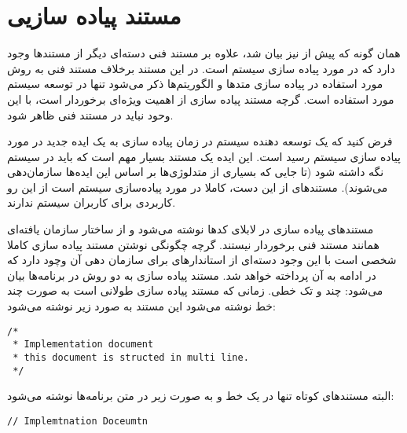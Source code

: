 %
% 
% 
% 
%
\section{مستند پیاده سازیی}
همان گونه که پیش از نیز بیان شد، علاوه بر مستند فنی دسته‌ای دیگر از مستندها وجود دارد که در مورد 
پیاده سازی سیستم است. در این مستند برخلاف مستند فنی به روش مورد استفاده در پیاده سازی متدها و 
الگوریتم‌ها ذکر می‌شود تنها در توسعه سیستم مورد استفاده است. گرچه مستند پیاده سازی از اهمیت ویژه‌ای
برخوردار است، با این وحود نباید در مستند فنی ظاهر شود.

فرض کنید که یک توسعه دهنده سیستم در زمان پیاده سازی به یک ایده جدید در مورد پیاده سازی سیستم 
رسید است. این ایده یک مستند بسیار مهم است که باید در سیستم نگه داشته شود (تا جایی که بسیاری
از متدلوژی‌ها بر اساس این ایده‌ها سازمان‌دهی می‌شوند). مستندهای از این دست، کاملا در مورد پیاده‌سازی
سیستم است از این رو کاربردی برای کاربران سیستم ندارند.

مستندهای پیاده سازی در لابلای کدها نوشته می‌شود و از ساختار سازمان یافته‌ای همانند مستند فنی برخوردار
نیستند. گرچه چگونگی نوشتن مستند پیاده سازی کاملا شخصی است با این وجود دسته‌ای از استاندارهای برای سازمان
دهی آن وچود دارد که در ادامه به آن پرداخته خواهد شد.
مستند پیاده سازی به دو روش در برنامه‌ها بیان می‌شود: چند و تک خطی. زمانی که مستند پیاده سازی طولانی
است به صورت چند خط نوشته می‌شود این مستند به صورد زیر نوشته می‌شود:
 
\begin{latin}
\lstset{language=C++}
\begin{lstlisting}[frame=single] 
/*
 * Implementation document
 * this document is structed in multi line.
 */
\end{lstlisting}
\end{latin}

البته مستندهای کوتاه تنها در یک خط و به صورت زیر در متن برنامه‌ها نوشته می‌شود:

\begin{latin}
\lstset{language=C++}
\begin{lstlisting}[frame=single] 
// Implemtnation Doceumtn
\end{lstlisting}
\end{latin}

